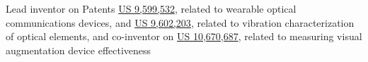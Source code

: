 \item Lead inventor on Patents \href{https://patents.google.com/patent/US9599532}{US 9,599,532}, related to wearable optical communications devices, 
and \href{https://patents.google.com/patent/US9602203B2/en}{US 9,602,203}, related to vibration characterization of optical elements, 
and co-inventor on \href{https://uspto.report/patent/grant/10,670,687}{US 10,670,687}, related to measuring visual augmentation device effectiveness